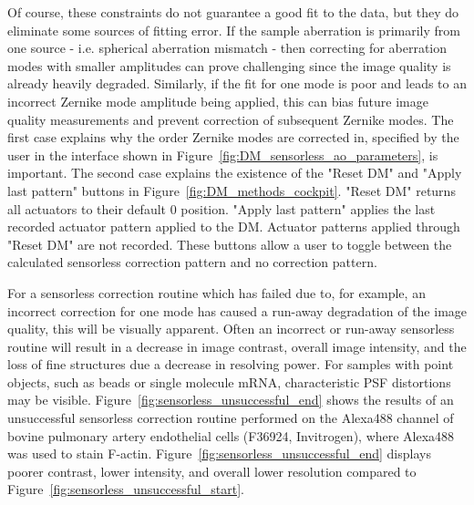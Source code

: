 Of course, these constraints do not guarantee a good fit to the data, but 
they do eliminate some sources of fitting error. If the sample aberration is 
primarily from one source - i.e. spherical aberration mismatch - then 
correcting for aberration modes with smaller amplitudes can prove challenging 
since the image quality is already heavily degraded. Similarly, if the fit 
for one mode is poor and leads to an incorrect Zernike mode amplitude being 
applied, this can bias future image quality measurements and prevent 
correction of subsequent Zernike modes. The first case explains why the order 
Zernike modes are corrected in, specified by the user in the interface shown 
in Figure~\ref{fig:DM_sensorless_ao_parameters}, is important. The second 
case explains the existence of the "Reset DM" and "Apply last pattern" 
buttons in Figure~\ref{fig:DM_methods_cockpit}. "Reset DM" returns all 
actuators to their default 0 position. "Apply last pattern" applies the last 
recorded actuator pattern applied to the DM. Actuator patterns applied 
through "Reset DM" are not recorded. These buttons allow a user to toggle 
between the calculated sensorless correction pattern and no correction 
pattern. 

For a sensorless correction routine which has failed due to, for example, an 
incorrect correction for one mode has caused a run-away degradation of the 
image quality, this will be visually apparent. Often an incorrect or run-away 
sensorless routine will result in a decrease in image contrast, overall image 
intensity, and the loss of fine structures due a decrease in resolving power. 
For samples with point objects, such as beads or single molecule mRNA, 
characteristic PSF distortions may be visible. 
Figure~\ref{fig:sensorless_unsuccessful_end} shows the results of an 
unsuccessful sensorless correction routine performed on the Alexa488 channel 
of bovine pulmonary artery endothelial cells (F36924, Invitrogen), where 
Alexa488 was used to stain F-actin. 
Figure~\ref{fig:sensorless_unsuccessful_end} displays poorer contrast, lower 
intensity, and overall lower resolution compared to 
Figure~\ref{fig:sensorless_unsuccessful_start}.

